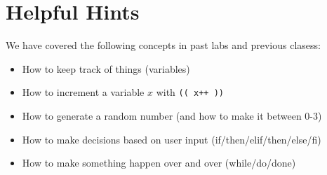 \documentclass{article}
\begin{document}
\section*{Helpful Hints}
We have covered the following concepts in past labs and previous clasess:
\begin{itemize}
    \item How to keep track of things (variables)
    \item How to increment a variable $x$ with \texttt{(( x++ ))}
    \item How to generate a random number (and how to make it between 0-3)
    \item How to make decisions based on user input (if/then/elif/then/else/fi)
    \item How to make something happen over and over (while/do/done)
\end{itemize}
\end{document}
